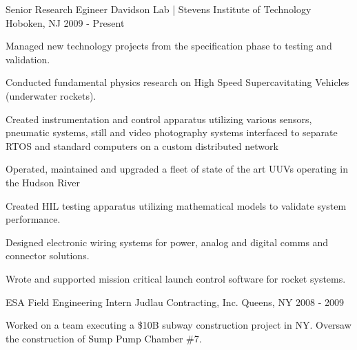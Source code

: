 

\begin{cventries}

  \cventry
    {Senior Research Egineer} %
    {Davidson Lab | Stevens Institute of Technology} %
    {Hoboken, NJ} %
    {2009 - Present} %
    {
      \begin{cvitems} %
        \item {Managed new technology projects from the specification phase to testing and validation.}
        \item {Conducted fundamental physics research on High Speed Supercavitating Vehicles (underwater rockets).}
        \item {Created instrumentation and control apparatus utilizing various sensors, pneumatic systems, still and video photography systems interfaced to separate RTOS and standard computers on a custom distributed network} 
        \item {Operated, maintained and upgraded a fleet of state of the art UUVs operating in the Hudson River}
        \item {Created HIL testing apparatus utilizing mathematical models to validate system performance.}
        \item {Designed electronic wiring systems for power, analog and digital comms and connector solutions.}
        \item {Wrote and supported mission critical launch control software for rocket systems.}
      \end{cvitems}
    }

  \cventry
    {ESA Field Engineering Intern} %
    {Judlau Contracting, Inc.} %
    {Queens, NY} %
    {2008 - 2009} %
    {
      \begin{cvitems} %
        \item {Worked on a team executing a \$10B subway construction project in NY. Oversaw the construction of Sump Pump Chamber \#7.}
      \end{cvitems}
    }

\end{cventries}
